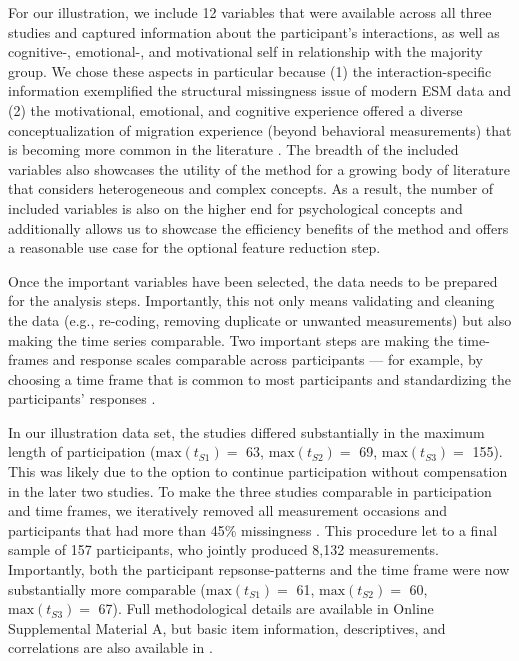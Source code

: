 For our illustration, we include 12 variables that were available across
all three studies and captured information about the participant's
interactions, as well as cognitive-, emotional-, and motivational self
in relationship with the majority group. We chose these aspects in
particular because (1) the interaction-specific information exemplified
the structural missingness issue of modern ESM data and (2) the
motivational, emotional, and cognitive experience offered a diverse
conceptualization of migration experience (beyond behavioral
measurements) that is becoming more common in the literature
\citep[][]{Kreienkamp2022d}. The breadth of the included variables also
showcases the utility of the method for a growing body of literature
that considers heterogeneous and complex concepts. As a result, the
number of included variables is also on the higher end for psychological
concepts and additionally allows us to showcase the efficiency benefits
of the method and offers a reasonable use case for the optional feature
reduction step.

Once the important variables have been selected, the data needs to be
prepared for the analysis steps. Importantly, this not only means
validating and cleaning the data (e.g., re-coding, removing duplicate or
unwanted measurements) but also making the time series comparable. Two
important steps are making the time-frames and response scales
comparable across participants --- for example, by choosing a time frame
that is common to most participants and standardizing the participants'
responses \citep{liao2005}.

In our illustration data set, the studies differed substantially in the
maximum length of participation (\(\text{max}(t_{S1})=\) 63,
\(\text{max}(t_{S2})=\) 69, \(\text{max}(t_{S3})=\) 155). This was
likely due to the option to continue participation without compensation
in the later two studies. To make the three studies comparable in
participation and time frames, we iteratively removed all measurement
occasions and participants that had more than 45\% missingness
\citep[which was in line with the general rcecommendation for data that might still need to rely on imputations for later model testing][]{Madley-Dowd2019}.
This procedure let to a final sample of 157 participants, who jointly
produced 8,132 measurements. Importantly, both the participant
repsonse-patterns and the time frame were now substantially more
comparable (\(\text{max}(t_{S1})=\) 61, \(\text{max}(t_{S2})=\) 60,
\(\text{max}(t_{S3})=\) 67). Full methodological details are available
in Online Supplemental Material A, but basic item information,
descriptives, and correlations are also available in
.


